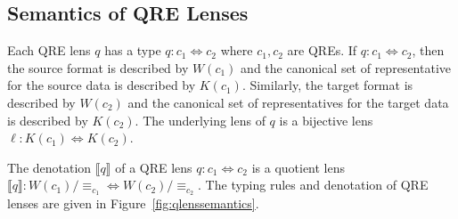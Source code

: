 \documentclass[acmsmall,review,anonymous]{acmart}
\newcommand{\eqrel}[1]{\ensuremath{\equiv_{#1}}}
\begin{document}
\subsection{Semantics of QRE Lenses}

Each QRE lens $q$ has a type $q : c_1 \Leftrightarrow c_2$ where $c_1, c_2$ are
QREs. If $q : c_1 \Leftrightarrow c_2$, then the source format is described by
$W(c_1)$ and the canonical set of representative for the source data is
described by $K(c_1)$.
Similarly, the target format is described by $W(c_2)$ and the canonical set of
representatives for the target data is described by $K(c_2)$. The underlying
lens of $q$ is a bijective lens $\ell : K(c_1) \Leftrightarrow K(c_2)$.

The denotation $\llbracket q \rrbracket$ of a QRE lens $q : c_1 \Leftrightarrow
c_2$ is a quotient lens $\llbracket q \rrbracket : W(c_1)/{\eqrel{c_1}}
\Longleftrightarrow W(c_2)/{\eqrel{c_2}}$. The typing rules and denotation of
QRE lenses are given in Figure~\ref{fig:qlenssemantics}.
\end{document}
